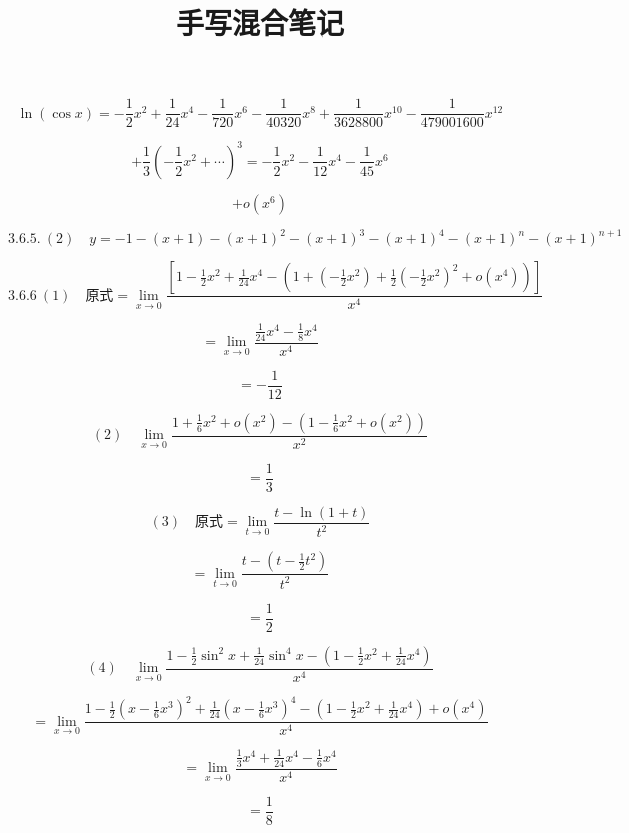 \documentclass[UTF8,fontset=windows]{ctexart}
\title{手写混合笔记}
\begin{document}
\maketitle
\[
\ln(\cos x)=-\frac{1}{2}x^{2}+\frac{1}{24}x^{4}-\frac{1}{720}x^{6}-\frac{1}{40320}x^{8}+\frac{1}{3628800}x^{10}-\frac{1}{479001600}x^{12}
\]

\[
+\frac{1}{3}\left(-\frac{1}{2}x^{2}+\cdots\right)^{3}=-\frac{1}{2}x^{2}-\frac{1}{12}x^{4}-\frac{1}{45}x^{6}
\]

\[
+o(x^{6})
\]

\[
3.6.5.\ (2)\quad y=-1-(x+1)-(x+1)^{2}-(x+1)^{3}-(x+1)^{4}-(x+1)^{n}-(x+1)^{n+1}
\]

\[
3.6.6\ (1)\quad \text{原式}=\lim_{x\to0}\frac{\left[1-\frac{1}{2}x^{2}+\frac{1}{24}x^{4}-\left(1+\left(-\frac{1}{2}x^{2}\right)+\frac{1}{2}\left(-\frac{1}{2}x^{2}\right)^{2}+o(x^{4})\right)\right]}{x^{4}}
\]

\[
=\lim_{x\to0}\frac{\frac{1}{24}x^{4}-\frac{1}{8}x^{4}}{x^{4}}
\]

\[
=-\frac{1}{12}
\]

\[
(2)\quad \lim_{x\to0}\frac{1+\frac{1}{6}x^{2}+o(x^{2})-\left(1-\frac{1}{6}x^{2}+o(x^{2})\right)}{x^{2}}
\]

\[
=\frac{1}{3}
\]

\[
(3)\quad \text{原式}=\lim_{t\to0}\frac{t-\ln(1+t)}{t^{2}}
\]

\[
=\lim_{t\to0}\frac{t-\left(t-\frac{1}{2}t^{2}\right)}{t^{2}}
\]

\[
=\frac{1}{2}
\]

\[
(4)\quad \lim_{x\to0}\frac{1-\frac{1}{2}\sin^{2}x+\frac{1}{24}\sin^{4}x-\left(1-\frac{1}{2}x^{2}+\frac{1}{24}x^{4}\right)}{x^{4}}
\]

\[
=\lim_{x\to0}\frac{1-\frac{1}{2}\left(x-\frac{1}{6}x^{3}\right)^{2}+\frac{1}{24}\left(x-\frac{1}{6}x^{3}\right)^{4}-\left(1-\frac{1}{2}x^{2}+\frac{1}{24}x^{4}\right)+o(x^{4})}{x^{4}}
\]

\[
=\lim_{x\to0}\frac{\frac{1}{3}x^{4}+\frac{1}{24}x^{4}-\frac{1}{6}x^{4}}{x^{4}}
\]

\[
=\frac{1}{8}
\]
\end{document}
